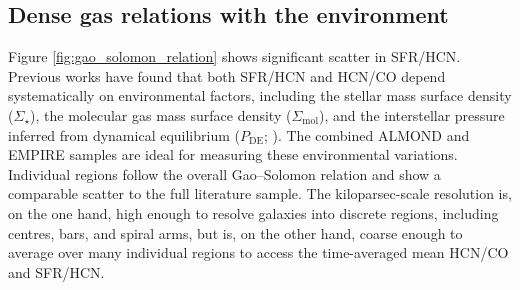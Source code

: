 \documentclass[letter, longauth]{aa} %
\newcommand*{\sigmol}{\ensuremath{\Sigma_{\text{mol}}}\xspace}  %
\newcommand*{\pde}{\ensuremath{P_{\text{DE}}}\xspace}  %
\newcommand*{\sigstar}{\ensuremath{\Sigma_{\star}}\xspace}  %
\begin{document}
\subsection{Dense gas relations with the environment}
\label{sec:environment_relations}

Figure \ref{fig:gao_solomon_relation} shows significant scatter in SFR/HCN. Previous works have found that both SFR/HCN and HCN/CO depend systematically on environmental factors, including the stellar mass surface density (\sigstar ), the molecular gas mass surface density (\sigmol ), and the interstellar pressure inferred from dynamical equilibrium (\pde; \citealt{Usero2015, Gallagher2018a, Jimenez-Donaire2019}). The combined ALMOND and EMPIRE samples are ideal for measuring these environmental variations. 
Individual regions follow the overall Gao--Solomon relation and show a comparable scatter to the full literature sample. The kiloparsec-scale resolution is, on the one hand, high enough to resolve galaxies into discrete regions, including centres, bars, and spiral arms, but is, on the other hand, coarse enough to average over many individual regions to access the time-averaged mean HCN/CO and SFR/HCN.
\end{document}
